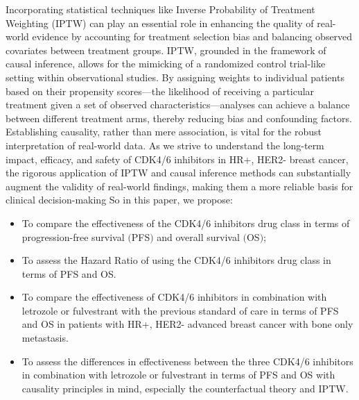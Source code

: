 Incorporating statistical techniques like Inverse Probability of Treatment Weighting (IPTW) can play an essential role in enhancing the quality of real-world evidence by accounting for treatment selection bias and balancing observed covariates between treatment groups. IPTW, grounded in the framework of causal inference, allows for the mimicking of a randomized control trial-like setting within observational studies. By assigning weights to individual patients based on their propensity scores—the likelihood of receiving a particular treatment given a set of observed characteristics—analyses can achieve a balance between different treatment arms, thereby reducing bias and confounding factors. Establishing causality, rather than mere association, is vital for the robust interpretation of real-world data. As we strive to understand the long-term impact, efficacy, and safety of CDK4/6 inhibitors in HR+, HER2- breast cancer, the rigorous application of IPTW and causal inference methods can substantially augment the validity of real-world findings, making them a more reliable basis for clinical decision-making \cite{austinIntroductionPropensityScore2011,austinUsePropensityScore2014}
So in this paper, we propose:
\begin{itemize}
    \item To compare the effectiveness of the CDK4/6 inhibitors drug class in terms of progression-free survival $($PFS$)$ and overall survival $($OS$)$;

    \item To assess the Hazard Ratio of using the CDK4/6 inhibitors drug class in terms of PFS and OS.
    
    \item  To compare the effectiveness of CDK4/6 inhibitors in combination with letrozole or fulvestrant with the previous standard of care in terms of PFS and OS in patients with HR+, HER2- advanced breast cancer with bone only metastasis.

    \item To assess the differences in effectiveness between the three CDK4/6 inhibitors in combination with letrozole or fulvestrant in terms of PFS and OS with causality principles in mind, especially the counterfactual theory and IPTW.
    
\end{itemize}
